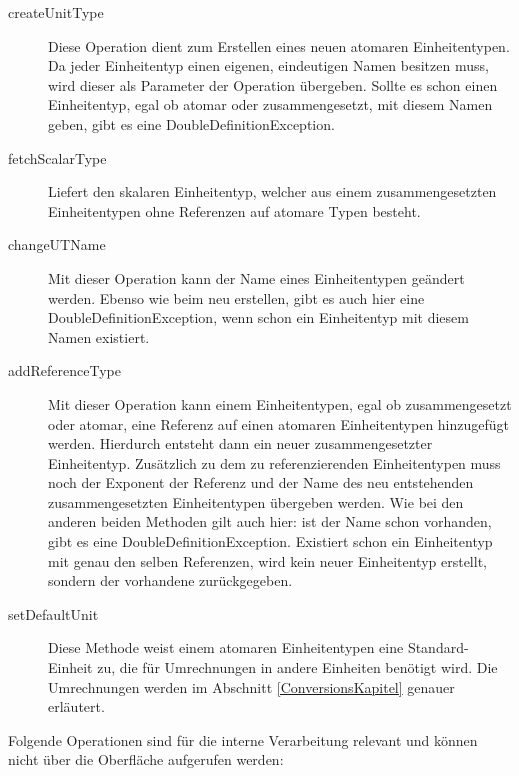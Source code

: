 \begin{description}
\item[createUnitType]
Diese Operation dient zum Erstellen eines neuen atomaren Einheitentypen. Da jeder Einheitentyp einen eigenen, eindeutigen Namen besitzen muss, wird dieser als Parameter der Operation übergeben. Sollte es schon einen Einheitentyp, egal ob atomar oder zusammengesetzt, mit diesem Namen geben, gibt es eine DoubleDefinitionException.
\item[fetchScalarType]
Liefert den skalaren Einheitentyp, welcher aus einem zusammengesetzten Einheitentypen ohne Referenzen auf atomare Typen besteht. 
\item[changeUTName]
Mit dieser Operation kann der Name eines Einheitentypen geändert werden. Ebenso wie beim neu erstellen, gibt es auch hier eine DoubleDefinitionException, wenn schon ein Einheitentyp mit diesem Namen existiert.
\item[addReferenceType]
Mit dieser Operation kann einem Einheitentypen, egal ob zusammengesetzt oder atomar, eine Referenz auf einen atomaren Einheitentypen hinzugefügt werden. Hierdurch entsteht dann ein neuer zusammengesetzter Einheitentyp. Zusätzlich zu dem zu referenzierenden Einheitentypen muss noch der Exponent der Referenz und der Name des neu entstehenden zusammengesetzten Einheitentypen übergeben werden. Wie bei den anderen beiden Methoden gilt auch hier: ist der Name schon vorhanden, gibt es eine DoubleDefinitionException. Existiert schon ein Einheitentyp mit genau den selben Referenzen, wird kein neuer Einheitentyp erstellt, sondern der vorhandene zurückgegeben.
\item[setDefaultUnit]
Diese Methode weist einem atomaren Einheitentypen eine Standard-Einheit zu, die für Umrechnungen in andere Einheiten benötigt wird. Die Umrechnungen werden im Abschnitt \ref{ConversionsKapitel} genauer erläutert.
\end{description}

Folgende Operationen sind für die interne Verarbeitung relevant und können nicht über die Oberfläche aufgerufen werden:

